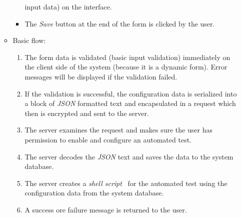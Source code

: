 \begin{enumerate}
\begin{itemize}
\begin{itemize}
                input data) on the
                interface.
            \item The \emph{Save} button at the end of the form is clicked by
                the user.
        \end{itemize}
    \item Basic flow:
        \begin{enumerate}
            \item The form data is validated (basic input validation)
                immediately on the client side of the system (because it is a
                dynamic form). Error messages
                will be displayed if the validation failed.
            \item If the validation is successful, the configuration data is
                serialized into a block of \emph{JSON} \cite{JSON} formatted text and
                encapsulated in a request which then is encrypted and sent to
                the server.
            \item The server examines the request and makes sure the user has
                permission to enable and configure an automated test.
            \item The server decodes the \emph{JSON} text and saves the data to
                the system database.
            \item The server creates a \emph{shell script}~\cite{shellScript}
                for the automated test using the configuration data from the
                system database.
            \item A success ore failure message is returned to the user.
        \end{enumerate}
\end{itemize}


\end{enumerate}
